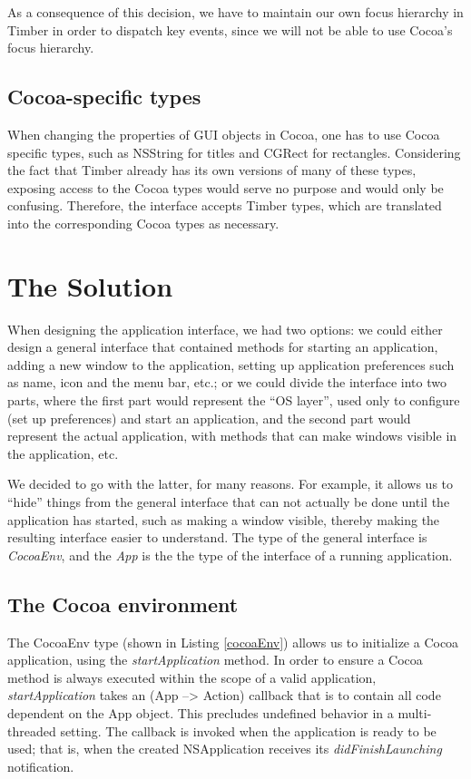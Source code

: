 \documentclass[a4paper]{article}
\begin{document}
As a consequence of this decision, we have to maintain our own focus hierarchy in Timber in order to dispatch key events, since we will not be able to use Cocoa's focus hierarchy.

\subsection{Cocoa-specific types}
When changing the properties of GUI objects in Cocoa, one has to use Cocoa specific types, such as NSString for titles and CGRect for rectangles. Considering the fact that Timber already has its own versions of many of these types, exposing access to the Cocoa types would serve no purpose and would only be confusing. Therefore, the interface accepts Timber types, which are translated into the corresponding Cocoa types as necessary.

\section{The Solution}
When designing the application interface, we had two options: we could either design a general interface that contained methods for starting an application, adding a new window to the application, setting up application preferences such as name, icon and the menu bar, etc.; or we could divide the interface into two parts, where the first part would represent the ``OS layer'', used only to configure (set up preferences) and start an application, and the second part would represent the actual application, with methods that can make windows visible in the application, etc.

We decided to go with the latter, for many reasons. For example, it allows us to ``hide'' things from the general interface that can not actually be done until the application has started, such as making a window visible, thereby making the resulting interface easier to understand. The type of the general interface is \textit{CocoaEnv}, and the \textit{App} is the the type of the interface of a running application.

\subsection{The Cocoa environment}
The CocoaEnv type (shown in Listing \ref{cocoaEnv})  allows us to initialize a Cocoa application, using the \textit{startApplication} method. In order to ensure a Cocoa method is always executed within the scope of a valid application, \textit{startApplication} takes an (App --> Action) callback that is to contain all code dependent on the App object. This precludes undefined behavior in a multi-threaded setting.
The callback is invoked when the application is ready to be used; that is, when the created NSApplication receives its \textit{didFinishLaunching} notification.
\end{document}
